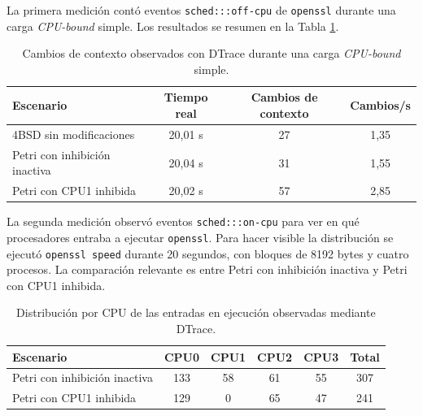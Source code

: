 La primera medición contó eventos \verb|sched:::off-cpu| de \verb|openssl| durante una carga \textit{CPU-bound} simple. Los resultados se resumen en la Tabla \ref{tabla:dtrace-context-switches-inhibicion}.\par

\begin{table}[H]
    \centering
    \small
    \setlength{\tabcolsep}{5pt}
    \begin{tabular}{|>{\RaggedRight\arraybackslash}p{}|c|c|c|}
        \hline
        \textbf{Escenario} & \textbf{Tiempo real} & \textbf{Cambios de contexto} & \textbf{Cambios/s} \\
        \hline
        4BSD sin modificaciones & 20,01 s & 27 & 1,35 \\
        \hline
        Petri con inhibición inactiva & 20,04 s & 31 & 1,55 \\
        \hline
        Petri con CPU1 inhibida & 20,02 s & 57 & 2,85 \\
        \hline
    \end{tabular}
    \caption{Cambios de contexto observados con DTrace durante una carga \textit{CPU-bound} simple.}
    \label{tabla:dtrace-context-switches-inhibicion}
\end{table}

La segunda medición observó eventos \verb|sched:::on-cpu| para ver en qué procesadores entraba a ejecutar \verb|openssl|. Para hacer visible la distribución se ejecutó \verb|openssl speed| durante 20 segundos, con bloques de 8192 bytes y cuatro procesos. La comparación relevante es entre Petri con inhibición inactiva y Petri con CPU1 inhibida.\par

\begin{table}[H]
    \centering
    \small
    \setlength{\tabcolsep}{5pt}
    \begin{tabular}{|>{\RaggedRight\arraybackslash}p{}|c|c|c|c|c|}
        \hline
        \textbf{Escenario} & \textbf{CPU0} & \textbf{CPU1} & \textbf{CPU2} & \textbf{CPU3} & \textbf{Total} \\
        \hline
        Petri con inhibición inactiva & 133 & 58 & 61 & 55 & 307 \\
        \hline
        Petri con CPU1 inhibida & 129 & 0 & 65 & 47 & 241 \\
        \hline
    \end{tabular}
    \caption{Distribución por CPU de las entradas en ejecución observadas mediante DTrace.}
    \label{tabla:dtrace-cpu-distribution-inhibicion}
\end{table}

